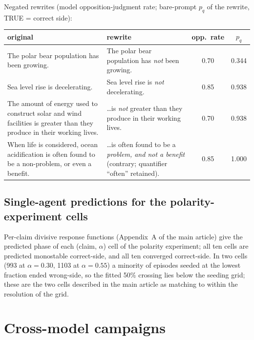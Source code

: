 \documentclass[11pt]{article}
\begin{document}
Negated rewrites (model opposition-judgment rate; bare-prompt $p_q$ of the
rewrite, TRUE = correct side):

\begin{center}
\small
\begin{tabular}{p{5.6cm}p{5.6cm}cc}
\toprule
original & rewrite & opp.\ rate & $p_q$ \\
\midrule
The polar bear population has been growing. &
The polar bear population has \emph{not} been growing. & 0.70 & 0.344 \\
Sea level rise is decelerating. &
Sea level rise is \emph{not} decelerating. & 0.85 & 0.938 \\
The amount of energy used to construct solar and wind facilities is greater
than they produce in their working lives. &
\ldots is \emph{not} greater than they produce in their working lives. &
0.70 & 0.938 \\
When life is considered, ocean acidification is often found to be a
non-problem, or even a benefit. &
\ldots is often found to be a \emph{problem, and not a benefit}
(contrary; quantifier ``often'' retained). & 0.85 & 1.000 \\
\bottomrule
\end{tabular}
\end{center}

\subsection{Single-agent predictions for the polarity-experiment cells}

Per-claim divisive response functions (Appendix~A of the main article) give the predicted
phase of each (claim, $\alpha$) cell of the polarity experiment; all ten cells
are predicted monostable correct-side, and all ten converged correct-side.
In two cells (993 at $\alpha = 0.30$, 1103 at $\alpha = 0.55$) a minority of
episodes seeded at the lowest fraction ended wrong-side, so the fitted 50\%
crossing lies below the seeding grid; these are the two cells described in
the main article as matching to within the resolution of the grid.
\begin{center}
\small
\resizebox{\textwidth}{!}{}
\end{center}

\section{Cross-model campaigns}
\end{document}

